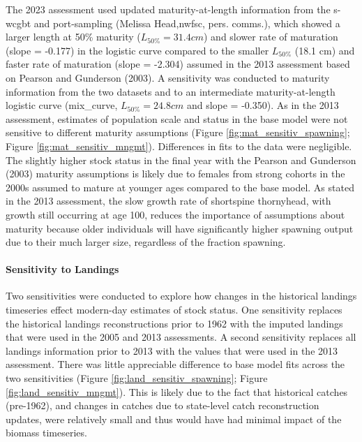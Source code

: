 \documentclass[11pt,
  english,
  letterpaper,
]{article}
\begin{document}
The 2023 assessment used updated maturity-at-length information from the \gls{s-wcgbt} and port-sampling (Melissa Head,\gls{nwfsc}, pers. comms.), which showed a larger length at 50\% maturity (\(L_{50\%} = 31.4 cm\)) and slower rate of maturation (slope = -0.177) in the logistic curve compared to the smaller \(L_{50\%}\) (18.1 cm) and faster rate of maturation (slope = -2.304) assumed in the 2013 assessment based on Pearson and Gunderson (2003). A sensitivity was conducted to maturity information from the two datasets and to an intermediate maturity-at-length logistic curve (mix\_curve, \(L_{50\%} = 24.8 cm\) and slope = -0.350). As in the 2013 assessment, estimates of population scale and status in the base model were not sensitive to different maturity assumptions (Figure \ref{fig:mat_sensitiv_spawning}; Figure \ref{fig:mat_sensitiv_mngmt}). Differences in fits to the data were negligible. The slightly higher stock status in the final year with the Pearson and Gunderson (2003) maturity assumptions is likely due to females from strong cohorts in the 2000s assumed to mature at younger ages compared to the base model. As stated in the 2013 assessment, the slow growth rate of shortspine thornyhead, with growth still occurring at age 100, reduces the importance of assumptions about maturity because older individuals will have significantly higher spawning output due to their much larger size, regardless of the fraction spawning.

\hypertarget{sensitivity-to-landings}{%
\paragraph{Sensitivity to Landings}\label{sensitivity-to-landings}}

Two sensitivities were conducted to explore how changes in the historical landings timeseries effect modern-day estimates of stock status. One sensitivity replaces the historical landings reconstructions prior to 1962 with the imputed landings that were used in the 2005 and 2013 assessments. A second sensitivity replaces all landings information prior to 2013 with the values that were used in the 2013 assessment. There was little appreciable difference to base model fits across the two sensitivities (Figure \ref{fig:land_sensitiv_spawning}; Figure \ref{fig:land_sensitiv_mngmt}). This is likely due to the fact that historical catches (pre-1962), and changes in catches due to state-level catch reconstruction updates, were relatively small and thus would have had minimal impact of the biomass timeseries.
\end{document}

